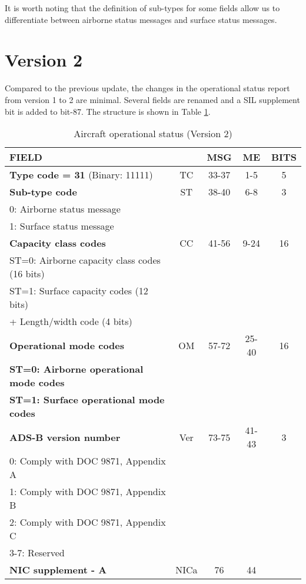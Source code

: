 It is worth noting that the definition of sub-types for some fields allow us to differentiate between airborne status messages and surface status messages.


\section{Version 2}

Compared to the previous update, the changes in the operational status report from version 1 to 2 are minimal. Several fields are renamed and a SIL supplement bit is added to bit-87. The structure is shown in Table \ref{tb:adsb-operational-status-v2}.


\begin{table}[ht]
\caption{Aircraft operational status (Version 2)}
\label{tb:adsb-operational-status-v2}
\footnotesize
\begin{tabular}{|l|c|c|c|c|}
\hline
\textbf{FIELD} &  & \textbf{MSG} & \textbf{ME} & \textbf{BITS} \\ \hline
\textbf{Type code = 31} (Binary: 11111) & TC & 33-37 & 1-5 & 5 \\ \hline
\textbf{Sub-type code} & ST & 38-40 & 6-8 & 3 \\
0: Airborne status message &&&& \\
1: Surface status message &&&& \\ \hline
\textbf{Capacity class codes} & CC & 41-56 & 9-24 & 16 \\
ST=0: Airborne capacity class codes (16 bits) &&&& \\
ST=1: Surface capacity codes (12 bits) &&&& \\
\quad\qquad+ Length/width code (4 bits) &&&& \\ \hline
\textbf{Operational mode codes} & OM & 57-72 & 25-40 & 16 \\
\textbf{ST=0: Airborne operational mode codes} &&&&\\
\textbf{ST=1: Surface operational mode codes} &&&& \\ \hline
\textbf{ADS-B version number} & Ver & 73-75 & 41-43 & 3\\ 
0: Comply with DOC 9871, Appendix A &&&&\\ 
1: Comply with DOC 9871, Appendix B &&&&\\ 
2: Comply with DOC 9871, Appendix C &&&&\\ 
3-7: Reserved &&&& \\ \hline
\textbf{NIC supplement - A} & NICa & 76 & 44 &  \\ \hline

\end{tabular}
\end{table}
